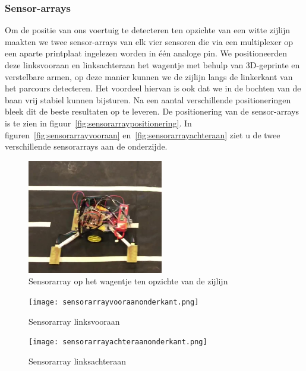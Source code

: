 \subsubsection*{Sensor-arrays}
Om de positie van ons voertuig te detecteren ten opzichte van een witte zijlijn maakten we twee sensor-arrays van elk vier sensoren die via een multiplexer op een aparte printplaat ingelezen worden in \'e\'en analoge pin. We positioneerden deze linksvooraan en linksachteraan het wagentje met behulp van 3D-geprinte en verstelbare armen, op deze manier kunnen we de zijlijn langs de linkerkant van het parcours detecteren. Het voordeel hiervan is ook dat we in de bochten van de baan vrij stabiel kunnen bijsturen. Na een aantal verschillende positioneringen bleek dit de beste resultaten op te leveren. De positionering van de sensor-arrays is te zien in figuur~\vref{fig:sensorarraypositionering}. In figuren~\vref{fig:sensorarrayvooraan} en~\vref{fig:sensorarrayachteraan} ziet u de twee verschillende sensorarrays aan de onderzijde.

\begin{figure}[H]
	\centering
	\includegraphics[height=5cm]{sensorarraypositionering.png}
	\caption{Sensorarray op het wagentje ten opzichte van de zijlijn\label{fig:sensorarraypositionering}}
\end{figure}

\begin{figure}[H]
	\centering
	\begin{minipage}[b]{0.4\textwidth}
		\centering
		\texttt{[image: sensorarrayvooraanonderkant.png]}
		\caption{Sensorarray linksvooraan}
		\label{fig:sensorarrayvooraan}
	\end{minipage}
	\hfill
	\begin{minipage}[b]{0.4\textwidth}
		\centering
		\texttt{[image: sensorarrayachteraanonderkant.png]}
		\caption{Sensorarray linksachteraan}
		\label{fig:sensorarrayachteraan}
	\end{minipage}
\end{figure}

